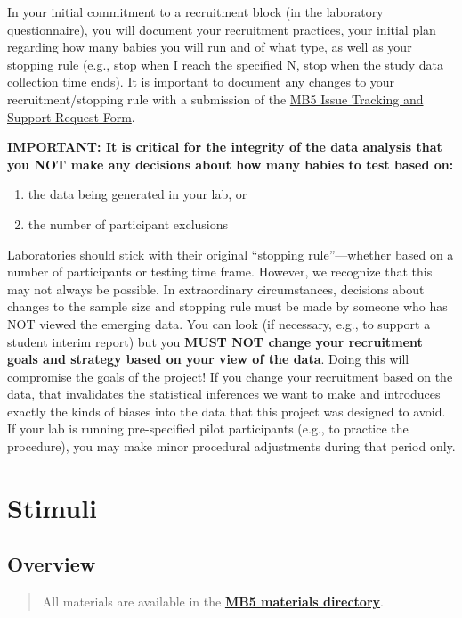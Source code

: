 \documentclass[
  letterpaper,
  DIV=11,
  numbers=noendperiod,
  oneside]{scrreprt}
\providecommand{\tightlist}{%
  \setlength{\itemsep}{0pt}\setlength{\parskip}{0pt}}
\begin{document}
In your initial commitment to a recruitment block (in the laboratory
questionnaire), you will document your recruitment practices, your
initial plan regarding how many babies you will run and of what type, as
well as your stopping rule (e.g., stop when I reach the specified N,
stop when the study data collection time ends). It is important to
document any changes to your recruitment/stopping rule with a submission
of the
\href{https://airtable.com/appRoqMKzcK3NsXt4/pagGafhoHcuVMs7ZV/form}{MB5
Issue Tracking and Support Request Form}.

\textbf{IMPORTANT: It is critical for the integrity of the data analysis
that you NOT make any decisions about how many babies to test based on:}

\begin{enumerate}
\def\labelenumi{\arabic{enumi}.}
\tightlist
\item
  the data being generated in your lab, or
\item
  the number of participant exclusions
\end{enumerate}

Laboratories should stick with their original ``stopping
rule''---whether based on a number of participants or testing time
frame. However, we recognize that this may not always be possible. In
extraordinary circumstances, decisions about changes to the sample size
and stopping rule must be made by someone who has NOT viewed the
emerging data. You can look (if necessary, e.g., to support a student
interim report) but you \textbf{MUST NOT change your recruitment goals
and strategy based on your view of the data}. Doing this will compromise
the goals of the project! If you change your recruitment based on the
data, that invalidates the statistical inferences we want to make and
introduces exactly the kinds of biases into the data that this project
was designed to avoid. If your lab is running pre-specified pilot
participants (e.g., to practice the procedure), you may make minor
procedural adjustments during that period only.

\chapter{Stimuli}\label{sec-stimuli}

\section{Overview}\label{overview-1}

\begin{quote}
All materials are available in the
\href{https://drive.google.com/drive/folders/1ces1jzHYVV0Wx29JAtdfGAZx_pDAAh5l?usp=sharing}{\textbf{MB5
materials directory}}.
\end{quote}
\end{document}
